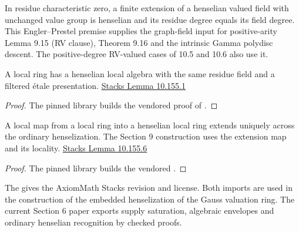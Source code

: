 \begin{assumption}
\label{hyp:finite-henselian-extension}
In residue characteristic zero, a finite extension of a henselian
valued field with unchanged value group is henselian and its residue
degree equals its field degree. This Engler--Prestel premise supplies
the graph-field input for positive-arity Lemma 9.15 (RV clause),
Theorem 9.16 and the intrinsic Gamma polydisc descent. The
positive-degree RV-valued cases of 10.5 and 10.6 also use it.
\end{assumption}

\begin{checkedimport}
\label{import:stacks-04GN}
\leanok
A local ring has a henselian local algebra with the same residue
field and a filtered étale presentation.
\href{https://stacks.math.columbia.edu/tag/04GN}{Stacks Lemma 10.155.1}
\end{checkedimport}
\begin{proof}
\leanok
The pinned library builds the vendored proof of
.
\end{proof}

\begin{checkedimport}
\label{import:stacks-04GS}
\leanok
A local map from a local ring into a henselian local ring extends
uniquely across the ordinary henselization. The Section 9 construction
uses the extension map and its locality.
\href{https://stacks.math.columbia.edu/tag/04GS}{Stacks Lemma 10.155.6}
\end{checkedimport}
\begin{proof}
\leanok
The pinned library builds the vendored
.
\end{proof}

The 
gives the AxiomMath Stacks revision and license. Both imports are used
in the construction of the embedded henselization of the Gauss
valuation ring.
The current Section 6 paper exports supply saturation, algebraic
envelopes and ordinary henselian recognition by checked proofs.
